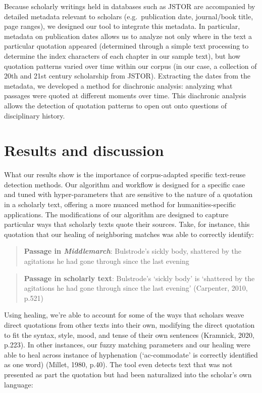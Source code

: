 \documentclass[
]{article}
\begin{document}
Because scholarly writings held in databases such as JSTOR are
accompanied by detailed metadata relevant to scholars (e.g.~publication
date, journal/book title, page ranges), we designed our tool to
integrate this metadata. In particular, metadata on publication dates
allows us to analyze not only where in the text a particular quotation
appeared (determined through a simple text processing to determine the
index characters of each chapter in our sample text), but how quotation
patterns varied over time within our corpus (in our case, a collection
of 20th and 21st century scholarship from JSTOR). Extracting the dates
from the metadata, we developed a method for diachronic analysis:
analyzing what passages were quoted at different moments over time. This
diachronic analysis allows the detection of quotation patterns to open
out onto questions of disciplinary history.

\hypertarget{results-and-discussion}{%
\section{Results and discussion}\label{results-and-discussion}}

What our results show is the importance of corpus-adapted specific
text-reuse detection methods. Our algorithm and workflow is designed for
a specific case and tuned with hyper-parameters that are sensitive to
the nature of a quotation in a scholarly text, offering a more nuanced
method for humanities-specific applications. The modifications of our
algorithm are designed to capture particular ways that scholarly texts
quote their sources. Take, for instance, this quotation that our healing
of neighboring matches was able to correctly identify:

\begin{quote}
\textbf{Passage in \emph{Middlemarch}}: Bulstrode's sickly body,
shattered by the agitations he had gone through since the last evening
\end{quote}

\begin{quote}
\textbf{Passage in scholarly text}: Bulstrode's `sickly body' is
`shattered by the agitations he had gone through since the last evening'
(Carpenter, 2010, p.521)
\end{quote}

Using healing, we're able to account for some of the ways that scholars
weave direct quotations from other texts into their own, modifying the
direct quotation to fit the syntax, style, mood, and tense of their own
sentences (Kramnick, 2020, p.223). In other instances, our fuzzy
matching parameters and our healing were able to heal across instance of
hyphenation (`ac-commodate' is correctly identified as one word)
(Millet, 1980, p.40). The tool even detects text that was not presented
as part the quotation but had been naturalized into the scholar's own
language:
\end{document}
